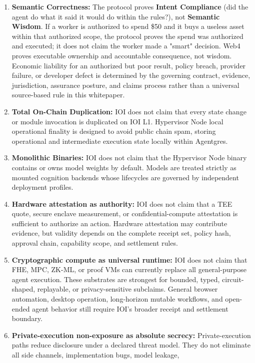 \documentclass[
  11pt,
]{article}
\begin{document}
\begin{enumerate}
\item
  \textbf{Semantic Correctness:} The protocol proves \textbf{Intent
  Compliance} (did the agent do what it said it would do within the
  rules?), not \textbf{Semantic Wisdom}. If a worker is authorized to
  spend \$50 and it buys a useless asset within that authorized scope,
  the protocol proves the spend was authorized and executed; it does not
  claim the worker made a "smart" decision. Web4 proves executable
  ownership and accountable consequence, not wisdom. Economic liability
  for an authorized but poor result, policy breach, provider failure, or
  developer defect is determined by the governing contract, evidence,
  jurisdiction, assurance posture, and claims process rather than a universal
  source-based rule in this whitepaper.
\item
  \textbf{Total On-Chain Duplication:} IOI does not claim that every
  state change or module invocation is duplicated on IOI L1. Hypervisor
  Node local operational finality is designed to avoid public chain spam, storing
  operational and intermediate execution state locally within Agentgres.
\item
  \textbf{Monolithic Binaries:} IOI does not claim that the Hypervisor
  Node binary contains or owns model weights by default. Models are
  treated strictly as mounted cognition backends whose lifecycles are
  governed by independent deployment profiles.
\item
  \textbf{Hardware attestation as authority:} IOI does not claim that a
  TEE quote, secure enclave measurement, or confidential-compute
  attestation is sufficient to authorize an action. Hardware attestation
  may contribute evidence, but validity depends on the complete receipt
  set, policy hash, approval chain, capability scope, and settlement
  rules.
\item
  \textbf{Cryptographic compute as universal runtime:} IOI does not
  claim that FHE, MPC, ZK-ML, or proof VMs can currently replace all
  general-purpose agent execution. These substrates are strongest for
  bounded, typed, circuit-shaped, replayable, or privacy-sensitive
  subclaims. General browser automation, desktop operation, long-horizon
  mutable workflows, and open-ended agent behavior still require IOI's
  broader receipt and settlement boundary.
\item
  \textbf{Private-execution non-exposure as absolute secrecy:}
  Private-execution paths reduce disclosure under a declared threat model. They do
  not eliminate all side channels, implementation bugs, model leakage,

\end{enumerate}
\end{document}
